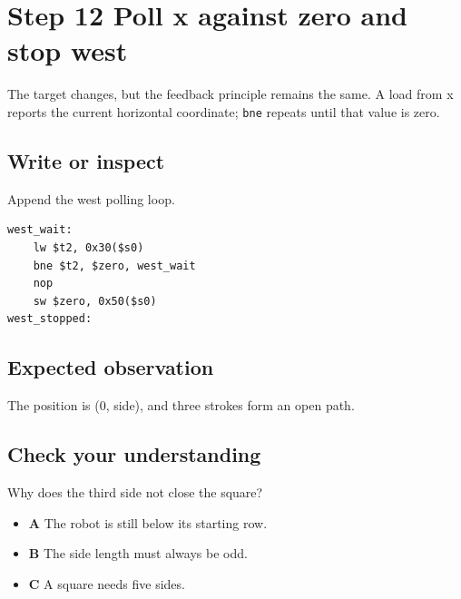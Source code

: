 \section{Step 12 Poll x against zero and stop
  west}\label{006-marsbot-square-s12-step-12-poll-x-against-zero-and-stop-west}

The target changes, but the feedback principle remains the same. A load
from x reports the current horizontal coordinate; \texttt{bne} repeats
until that value is zero.

\subsection{Write or
  inspect}\label{006-marsbot-square-s12-write-or-inspect}

Append the west polling loop.

\begin{verbatim}
west_wait:
    lw $t2, 0x30($s0)
    bne $t2, $zero, west_wait
    nop
    sw $zero, 0x50($s0)
west_stopped:
\end{verbatim}

\subsection{Expected
  observation}\label{006-marsbot-square-s12-expected-observation}

The position is (0, side), and three strokes form an open path.

\subsection{Check your
  understanding}\label{006-marsbot-square-s12-check-your-understanding}

Why does the third side not close the square?

\begin{itemize}
  \tightlist
  \item
        \textbf{A} The robot is still below its starting row.
  \item
        \textbf{B} The side length must always be odd.
  \item
        \textbf{C} A square needs five sides.
\end{itemize}
